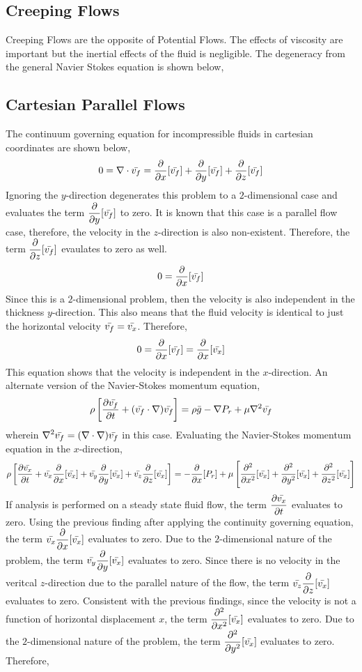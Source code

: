 \documentclass[a4paper, 12pt]{report}
\begin{document}
\begin{center}
\chapter{Creeping Flows}
\begin{comment}
\end{comment}
Creeping Flows are the opposite of Potential Flows. The effects of viscosity are important but the inertial effects of the fluid is negligible. The degeneracy from the general Navier Stokes equation is shown below,
\section{Cartesian Parallel Flows}
\begin{comment}
\end{comment}
The continuum governing equation for incompressible fluids in cartesian coordinates are shown below,
$$0 = \nabla\cdot\bar{v_f} = \frac{\partial}{\partial x}[\bar{v_f}] + \frac{\partial}{\partial y}[\bar{v_f}] + \frac{\partial}{\partial z}[\bar{v_f}]$$
Ignoring the $y$-direction degenerates this problem to a $2$-dimensional case and evaluates the term $\displaystyle{\frac{\partial}{\partial y}[\bar{v_f}]}$ to zero. It is known that this case is a parallel flow case, therefore, the velocity in the $z$-direction is also non-existent. Therefore, the term $\displaystyle{\frac{\partial}{\partial z}[\bar{v_f}]}$ evaulates to zero as well.  
$$0 = \frac{\partial}{\partial x}[\bar{v_f}]$$
Since this is a $2$-dimensional problem, then the velocity is also independent in the thickness $y$-direction. This also means that the fluid velocity is identical to just the horizontal velocity $\displaystyle{\bar{v_f} = \bar{v_x}}$. Therefore,
$$0 = \frac{\partial}{\partial x}[\bar{v_f}] = \frac{\partial}{\partial x}[\bar{v_x}]$$
This equation shows that the velocity is independent in the $x$-direction. 
An alternate version of the Navier-Stokes momentum equation,
$$\rho\left[\frac{\partial\bar{v_f}}{\partial t} + (\bar{v_f}\cdot\nabla)\bar{v_f}\right] = \rho \bar{g} - \nabla P_r + \mu\nabla^2\bar{v_f}$$
wherein $\displaystyle{\nabla^2 \bar{v_f} = (\nabla \cdot\nabla)\bar{v_f}}$ in this case. Evaluating the Navier-Stokes momentum equation in the $x$-direction,
$$\rho\left[\frac{\partial\bar{v_x}}{\partial t} + \bar{v_x}\frac{\partial}{\partial x}[\bar{v_x}] + \bar{v_y}\frac{\partial}{\partial y}[\bar{v_x}] + \bar{v_z}\frac{\partial}{\partial z}[\bar{v_x}]\right] = - \frac{\partial}{\partial x}[P_r] + \mu\left[\frac{\partial^2}{\partial x^2}[\bar{v_x}] + \frac{\partial^2}{\partial y^2}[\bar{v_x}] + \frac{\partial^2}{\partial z^2}[\bar{v_x}]\right]$$
If analysis is performed on a steady state fluid flow, the term $\displaystyle{\frac{\partial\bar{v_x}}{\partial t}}$ evaluates to zero. Using the previous finding after applying the continuity governing equation, the term $\displaystyle{\bar{v_x}\frac{\partial}{\partial x}[\bar{v_x}]}$ evaluates to zero. Due to the $2$-dimensional nature of the problem, the term $\displaystyle{\bar{v_y}\frac{\partial}{\partial y}[\bar{v_x}]}$ evaluates to zero. Since there is no velocity in the veritcal $z$-direction due to the parallel nature of the flow, the term $\displaystyle{\bar{v_z}\frac{\partial}{\partial z}[\bar{v_x}]}$ evaluates to zero. Consistent with the previous findings, since the velocity is not a function of horizontal displacement $x$, the term $\displaystyle{\frac{\partial^2}{\partial x^2}[\bar{v_x}]}$ evaluates to zero. Due to the $2$-dimensional nature of the problem, the term $\displaystyle{\frac{\partial^2}{\partial y^2}[\bar{v_x}]}$ evaluates to zero. Therefore,

\end{center}
\end{document}
